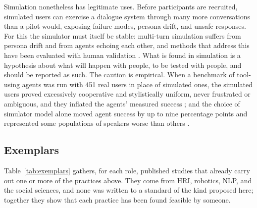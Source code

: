 Simulation nonetheless has legitimate uses. Before participants are
recruited, simulated users can exercise a dialogue system through many more
conversations than a pilot would, exposing failure modes, persona drift, and
unsafe responses. For this the simulator must itself be stable: multi-turn
simulation suffers from persona drift and from agents echoing each other, and
methods that address this have been evaluated with human validation
\cite{luo2026spasm}. What is found in simulation is a hypothesis about what
will happen with people, to be tested with people, and should be reported as
such. The caution is empirical. When a benchmark of tool-using agents was
run with 451 real users in place of simulated ones, the simulated users
proved excessively cooperative and stylistically uniform, never frustrated
or ambiguous, and they inflated the agents' measured success
\cite{zhou2026mind}; and the choice of simulator model alone moved agent
success by up to nine percentage points and represented some populations of
speakers worse than others \cite{seshadri2026lost}.

\subsection{Exemplars}

Table~\ref{tab:exemplars} gathers, for each role, published studies that
already carry out one or more of the practices above. They come from HRI,
robotics, NLP, and the social sciences, and none was written to a standard
of the kind proposed here; together they show that each practice has been
found feasible by someone.

